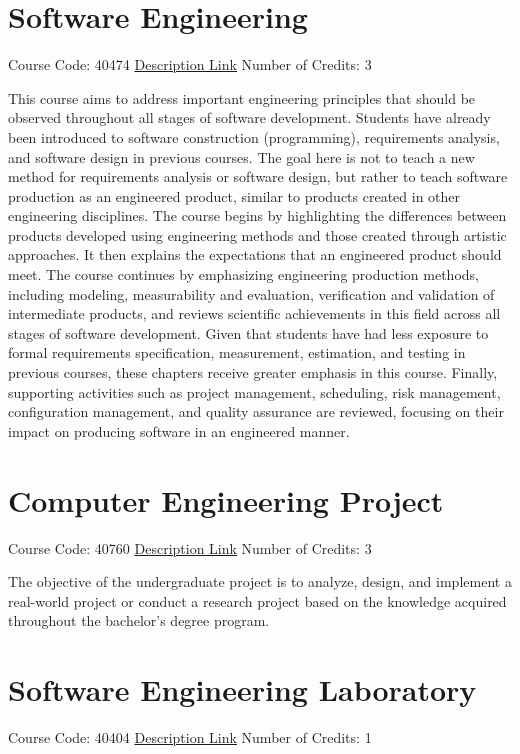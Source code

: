 \documentclass[
fontsize=11pt,
paper=a4,
parskip=half,
enlargefirstpage=off,    %
fromalign=right,        %
fromphone=on,           %
fromemail=on,
fromrule=off,           %
addrfield=off,          %
backaddress=on,         %
subject=beforeopening,  %
locfield=narrow,        %
foldmarks=off,          %
open=any
]{scrartcl}
\begin{document}
\section{Software Engineering}
Course Code: 40474 \qquad \quad \href{https://docs.ce.sharif.edu/course/40474}{Description Link}
\qquad \quad Number of Credits: 3

This course aims to address important engineering principles that should be observed throughout all stages of software development. Students have already been introduced to software construction (programming), requirements analysis, and software design in previous courses. The goal here is not to teach a new method for requirements analysis or software design, but rather to teach software production as an engineered product, similar to products created in other engineering disciplines. The course begins by highlighting the differences between products developed using engineering methods and those created through artistic approaches. It then explains the expectations that an engineered product should meet. The course continues by emphasizing engineering production methods, including modeling, measurability and evaluation, verification and validation of intermediate products, and reviews scientific achievements in this field across all stages of software development. Given that students have had less exposure to formal requirements specification, measurement, estimation, and testing in previous courses, these chapters receive greater emphasis in this course. Finally, supporting activities such as project management, scheduling, risk management, configuration management, and quality assurance are reviewed, focusing on their impact on producing software in an engineered manner.

\section{Computer Engineering Project}
Course Code: 40760 \qquad \quad \href{https://docs.ce.sharif.edu/course/40760}{Description Link}
\qquad \quad Number of Credits: 3

The objective of the undergraduate project is to analyze, design, and implement a real-world project or conduct a research project based on the knowledge acquired throughout the bachelor's degree program.

\section{Software Engineering Laboratory}
Course Code: 40404 \qquad \quad \href{https://docs.ce.sharif.edu/course/40404}{Description Link}
\qquad \quad Number of Credits: 1
\end{document}
